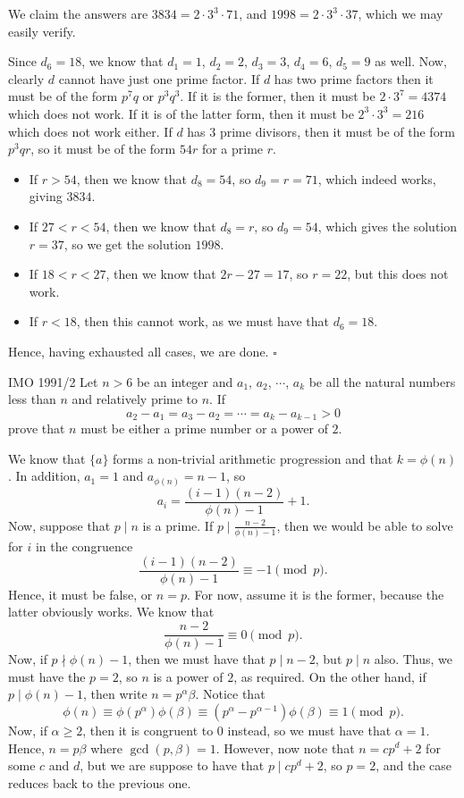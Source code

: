 \documentclass{article}
\begin{document}
We claim the answers are $\boxed{3834} = 2\cdot 3^3\cdot 71$, and $\boxed{1998} = 2\cdot 3^3\cdot 37$, which we may easily verify. 

Since $d_6 = 18$, we know that $d_1 = 1$, $d_2 = 2$, $d_3 = 3$, $d_4 = 6$, $d_5 = 9$ as well. Now, clearly $d$ cannot have just one prime factor. If $d$ has two prime factors then it must be of the form $p^7q$ or $p^3q^3$. If it is the former, then it must be $2\cdot 3^7 = 4374$ which does not work. If it is of the latter form, then it must be $2^3\cdot 3^3 = 216$ which does not work either. If $d$ has $3$ prime divisors, then it must be of the form $p^3qr$, so it must be of the form $54r$ for a prime $r$.
\begin{itemize}
\item If $r > 54$, then we know that $d_8 = 54$, so $d_9 = r = 71$, which indeed works, giving $3834$.
\item If $27 < r < 54$, then we know that $d_8 = r$, so $d_9 = 54$, which gives the solution $r = 37$, so we get the solution $1998$.
\item If $18 < r < 27$, then we know that $2r-27 = 17$, so $r = 22$, but this does not work.
\item If $r < 18$, then this cannot work, as we must have that $d_6 = 18$.
\end{itemize}
Hence, having exhausted all cases, we are done. $\square$

\begin{problem}[3.7.11]{IMO 1991/2}
Let $n > 6$ be an integer and $a_1$, $a_2$, $\cdots$, $a_k$ be all the natural numbers less than $n$ and relatively prime to $n$. If \[a_2 - a_1 = a_3 - a_2 = \cdots = a_k - a_{k-1} > 0\] prove that $n$ must be either a prime number or a power of $2$.
\end{problem}

We know that $\{a\}$ forms a non-trivial arithmetic progression and that $k = \phi(n)$. In addition, $a_1 = 1$ and $a_{\phi(n)} = n-1$, so \[a_i = \dfrac{(i-1)(n-2)}{\phi(n)-1}+1.\] Now, suppose that $p \mid n$ is a prime. If $p \mid \tfrac{n-2}{\phi(n)-1}$, then we would be able to solve for $i$ in the congruence \[\dfrac{(i-1)(n-2)}{\phi(n)-1} \equiv -1 \pmod{p}.\] Hence, it must be false, or $n = p$. For now, assume it is the former, because the latter obviously works. We know that \[\dfrac{n-2}{\phi(n)-1} \equiv 0 \pmod{p}.\] Now, if $p \nmid \phi(n)-1$, then we must have that $p \mid n-2$, but $p \mid n$ also. Thus, we must have the $p = 2$, so $n$ is a power of $2$, as required. On the other hand, if $p \mid \phi(n)-1$, then write $n = p^{\alpha}\beta$. Notice that \[\phi(n) \equiv \phi(p^{\alpha})\phi(\beta) \equiv (p^{\alpha}-p^{\alpha-1})\phi(\beta) \equiv 1\pmod{p}.\] Now, if $\alpha \ge 2$, then it is congruent to $0$ instead, so we must have that $\alpha = 1$. Hence, $n = p\beta$ where $\gcd(p, \beta) = 1$. However, now note that $n = cp^d+2$ for some $c$ and $d$, but we are suppose to have that $p \mid cp^d+2$, so $p = 2$, and the case reduces back to the previous one.
\end{document}
